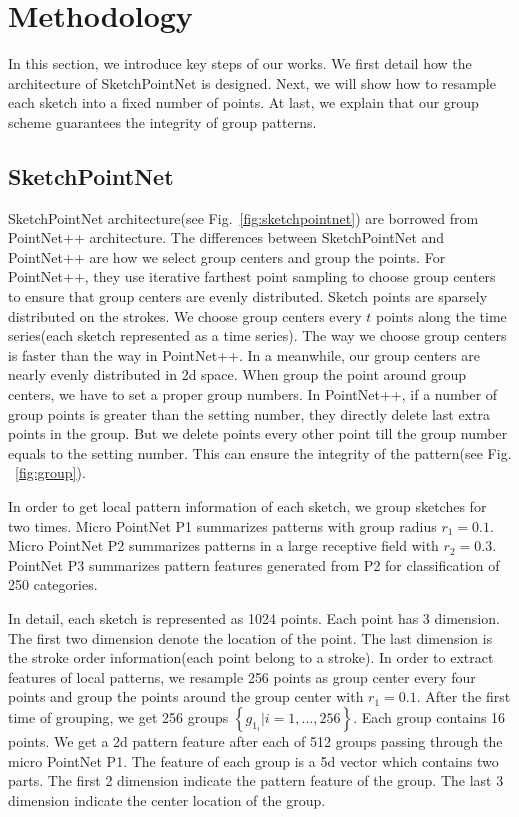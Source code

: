 \section{Methodology}
\label{sec:methodology}

In this section, we introduce key steps of our works. We first detail how the architecture of SketchPointNet is designed. Next, we will show how to resample each sketch into a fixed number of points. At last, we explain that our group scheme guarantees the integrity of group patterns.

\subsection{SketchPointNet}
\label{ssec:sketch_point_net}

SketchPointNet architecture(see Fig.~\ref{fig:sketchpointnet}) are borrowed from PointNet++ architecture. The differences between SketchPointNet and PointNet++ are how we select group centers and group the points. For PointNet++, they use iterative farthest point sampling to choose group centers to ensure that group centers are evenly distributed. Sketch points are sparsely distributed on the strokes. We choose group centers every $t$ points along the time series(each sketch represented as a time series). The way we choose group centers is faster than the way in PointNet++. In a meanwhile,
our group centers are nearly evenly distributed in 2d space. When group the point around group centers, we have to set a proper group numbers. In PointNet++, if a number of group points  is greater than the setting number, they directly delete last extra points in the group. But we delete points every other point till the group number equals to the setting number. This can ensure the integrity of the pattern(see Fig. ~\ref{fig:group}).

In order to get local pattern information of each sketch, we group sketches for two times. Micro PointNet P1 summarizes patterns with group radius $r_1 = 0.1$. Micro PointNet P2 summarizes patterns in a large receptive field with $r_2 = 0.3$. PointNet P3 summarizes pattern features generated from P2 for classification of 250 categories.

In detail, each sketch is represented as 1024 points. Each point has 3 dimension. The first two dimension denote the location of the point. The last dimension is the stroke order information(each point belong to a stroke). In order to extract features of local patterns, we resample 256 points as group center every four points and group the points around the group center with $r_1 = 0.1$. After the first time of grouping, we get 256 groups $\left\{ g_{1_i}| i = 1, ..., 256 \right\}$. Each group contains 16 points. We get a 2d pattern feature after each of 512 groups passing through the micro PointNet P1. The feature of each group is a 5d vector which contains two parts. The first 2 dimension indicate the pattern feature of the group. The last 3 dimension indicate the center location of the group.

